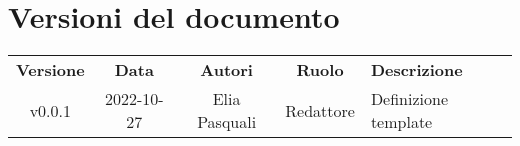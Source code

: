 \section*{Versioni del documento}
\begin{tabular}{c|c|c|c|l}
    \textbf{Versione} & \textbf{Data} & \textbf{Autori} & \textbf{Ruolo} & \textbf{Descrizione} \\
    v0.0.1 & 2022-10-27 & Elia Pasquali & Redattore & Definizione template
\end{tabular}
